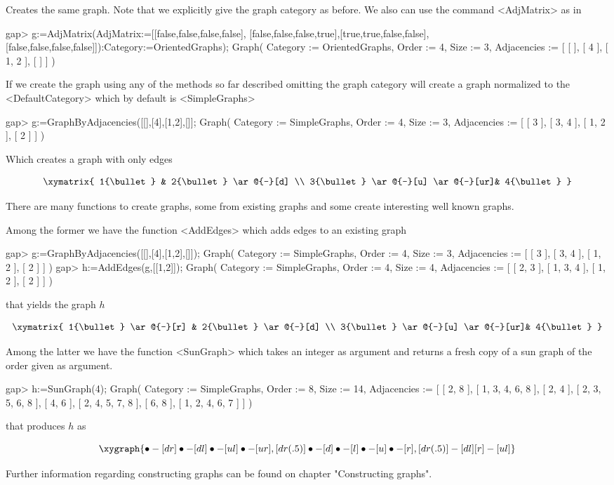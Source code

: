 Creates the same graph. Note that we explicitly give the graph
category as before. We also can use the command <AdjMatrix> as in

\beginexample
gap> g:=AdjMatrix(AdjMatrix:=[[false,false,false,false],
         [false,false,false,true],[true,true,false,false],
         [false,false,false,false]]):Category:=OrientedGraphs);
Graph( Category := OrientedGraphs, Order := 4, Size := 3, Adjacencies :=
[ [  ], [ 4 ], [ 1, 2 ], [  ] ] )
\endexample

If we create the graph using any of the methods so far
described omitting the graph category {\YAGS} will create a graph
normalized to the <DefaultCategory> which by default is <SimpleGraphs>

\beginexample
gap> g:=GraphByAdjacencies([[],[4],[1,2],[]];
Graph( Category := SimpleGraphs, Order := 4, Size := 3, Adjacencies :=
[ [ 3 ], [ 3, 4 ], [ 1, 2 ], [ 2 ] ] )
\endexample

Which creates a graph with only edges

$$
\xymatrix{
   1{\bullet} & 2{\bullet} \ar@{-}[d] \\
   3{\bullet} \ar@{-}[u] \ar@{-}[ur]& 4{\bullet} 
}  
$$

There are many functions to create graphs, some from existing graphs
and some create interesting well known graphs.

Among the former we have the function <AddEdges> which adds edges to an
existing graph

\beginexample
gap> g:=GraphByAdjacencies([[],[4],[1,2],[]]);
Graph( Category := SimpleGraphs, Order := 4, Size := 3, Adjacencies :=
[ [ 3 ], [ 3, 4 ], [ 1, 2 ], [ 2 ] ] )
gap> h:=AddEdges(g,[[1,2]]);
Graph( Category := SimpleGraphs, Order := 4, Size := 4, Adjacencies :=
[ [ 2, 3 ], [ 1, 3, 4 ], [ 1, 2 ], [ 2 ] ] )
\endexample

that yields the graph $h$

$$
\xymatrix{
   1{\bullet} \ar@{-}[r] & 2{\bullet} \ar@{-}[d] \\
   3{\bullet} \ar@{-}[u] \ar@{-}[ur]& 4{\bullet} 
}  
$$

Among the latter we have the function <SunGraph> which takes an
integer as argument and returns a fresh copy of a sun graph of the
order given as argument.

\beginexample
gap> h:=SunGraph(4);
Graph( Category := SimpleGraphs, Order := 8, Size := 14, Adjacencies :=
[ [ 2, 8 ], [ 1, 3, 4, 6, 8 ], [ 2, 4 ], [ 2, 3, 5, 6, 8 ], [ 4, 6 ],
  [ 2, 4, 5, 7, 8 ], [ 6, 8 ], [ 1, 2, 4, 6, 7 ] ] )
\endexample

that produces $h$ as

$$
\xygraph{
 \bullet-[dr]\bullet-[dl]\bullet-[ul]\bullet-[ur],
 [dr(.5)]\bullet-[d]\bullet-[l]\bullet-[u]\bullet-[r],
 [dr(.5)]-[dl][r]-[ul]
}
$$

Further information regarding constructing graphs can be found on
chapter "Constructing graphs".

